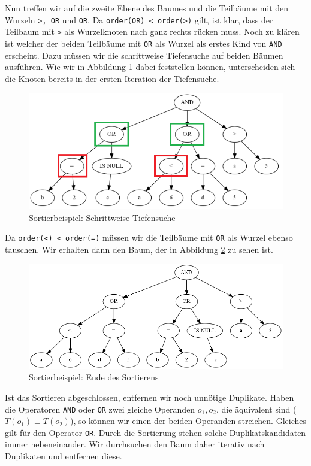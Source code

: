 Nun treffen wir auf die zweite Ebene des Baumes und die Teilbäume mit den Wurzeln \verb|>, OR| und \verb|OR|. Da \verb|order(OR) < order(>)| gilt, ist klar, dass der Teilbaum mit \verb|>| als Wurzelknoten nach ganz rechts rücken muss. Noch zu klären ist welcher der beiden Teilbäume mit \verb|OR| als Wurzel als erstes Kind von \verb|AND| erscheint. Dazu müssen wir die schrittweise Tiefensuche auf beiden Bäumen ausführen. Wie wir in Abbildung \ref{fig:sort_step2} dabei feststellen können, unterscheiden sich die Knoten bereits in der ersten Iteration der Tiefensuche.

\begin{figure}[h]
\centering
\includegraphics[scale=0.55]{Bilder/sort_step2.png}
\caption{Sortierbeispiel: Schrittweise Tiefensuche}
\label{fig:sort_step2}
\end{figure}

 Da \verb|order(<) < order(=)| müssen wir die Teilbäume mit \verb|OR| als Wurzel ebenso tauschen. Wir erhalten dann den Baum, der in Abbildung \ref{fig:sort_zwischen4} zu sehen ist.

\begin{figure}[h]
\centering
\includegraphics[scale=0.55]{Bilder/sort_zwischen4.png}
\caption{Sortierbeispiel: Ende des Sortierens}
\label{fig:sort_zwischen4}
\end{figure}

Ist das Sortieren abgeschlossen, entfernen wir noch unnötige Duplikate. Haben die Operatoren \verb|AND| oder \verb|OR| zwei gleiche Operanden $o_1,o_2$, die äquivalent sind ($T(o_1) \equiv T(o_2)$), so können wir einen der beiden Operanden streichen. Gleiches gilt für den Operator \verb|OR|. Durch die Sortierung stehen solche Duplikatskandidaten immer nebeneinander. Wir durchsuchen den Baum daher iterativ nach Duplikaten und entfernen diese.


